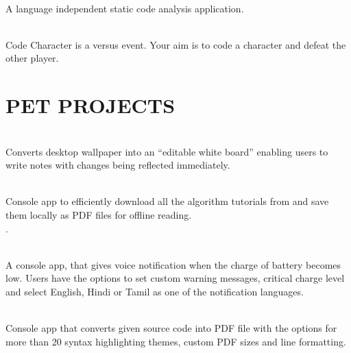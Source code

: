 \documentclass[]{deedy-resume-openfont}
\begin{document}
\begin{minipage}[t]{0.66\textwidth}
\\
A language independent static code analysis application. \textbf{\href{https://github.com/coala-analyzer}{ }}
\sectionsep

\\
Code Character is a versus event. Your aim is to code a character and defeat the other player.
\textbf{\href{https://github.com/ash7594/code-control}{}}
\sectionsep

\section{PET PROJECTS}
\\
Converts desktop wallpaper into an “editable white board” enabling users to write notes with changes being reflected immediately. \textbf{\href{https://github.com/tushar-rishav/wallnote}{ }}
\sectionsep

\\
Console app to efficiently download all the algorithm tutorials from  and save them locally as PDF files for offline reading.\\ \textbf{\href{https://github.com/tushar-rishav/topcoder-dl}{}}.
\sectionsep 

\\
A console app, that gives voice notification when the charge of battery becomes low. Users have the options to set custom warning messages, critical charge level and select English, Hindi or Tamil as one of the notification languages. \textbf{\href{https://github.com/tushar-rishav/balert}{}}
\sectionsep

\\
Console app that converts given source code into PDF file with the options for more than 20 syntax highlighting themes, custom PDF sizes and line formatting. \textbf{\href{https://github.com/tushar-rishav/code2pdf}{}}
\sectionsep



\end{minipage} 
\end{document}

